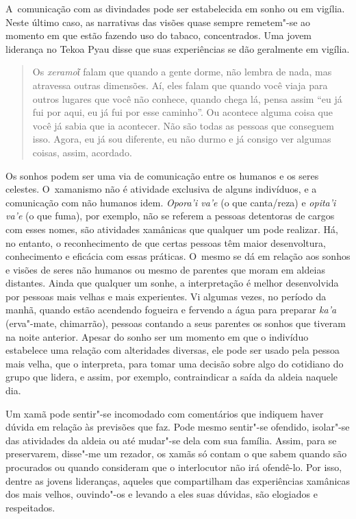 A~comunicação com as divindades pode ser estabelecida em sonho ou em
vigília. Neste último caso, as narrativas das visões quase sempre
remetem"-se ao momento em que estão fazendo uso do tabaco, concentrados.
Uma jovem liderança no Tekoa Pyau disse que suas experiências se dão
geralmente em vigília.

\begin{quote}
Os \emph{xeramoῖ} falam que quando a gente dorme, não lembra de nada,
mas atravessa outras dimensões. Aí, eles falam que quando você viaja
para outros lugares que você não conhece, quando chega lá, pensa assim
``eu já fui por aqui, eu já fui por esse caminho''. Ou acontece alguma
coisa que você já sabia que ia acontecer. Não são todas as pessoas que
conseguem isso. Agora, eu já sou diferente, eu não durmo e já consigo
ver algumas coisas, assim, acordado.
\end{quote}

Os sonhos podem ser uma via de comunicação entre os humanos e os seres
celestes. O~xamanismo não é atividade exclusiva de alguns indivíduos, e
a comunicação com não humanos idem. \emph{Opora’i va’e} (o que canta/reza) e
\emph{opita’i va’e} (o que fuma), por exemplo, não se referem a pessoas
detentoras de cargos com esses nomes, são atividades xamânicas que
qualquer um pode realizar. Há, no entanto, o reconhecimento de que
certas pessoas têm maior desenvoltura, conhecimento e eficácia com
essas práticas. O~mesmo se dá em relação aos sonhos e visões de seres
não humanos ou mesmo de parentes que moram em aldeias distantes. Ainda
que qualquer um sonhe, a interpretação é melhor desenvolvida por
pessoas mais velhas e mais experientes. Vi algumas vezes, no período da
manhã, quando estão acendendo fogueira e fervendo a água para preparar
\emph{ka’a} (erva"-mate, chimarrão), pessoas contando a seus parentes os sonhos
que tiveram na noite anterior. Apesar do sonho ser um momento em que o
indivíduo estabelece uma relação com alteridades diversas, ele pode ser
usado pela pessoa mais velha, que o interpreta, para tomar uma decisão
sobre algo do cotidiano do grupo que lidera, e assim, por exemplo,
contraindicar a saída da aldeia naquele dia.

Um xamã pode sentir"-se incomodado com comentários que indiquem haver
dúvida em relação às previsões que faz. Pode mesmo sentir"-se ofendido,
isolar"-se das atividades da aldeia ou até mudar"-se dela com sua
família. Assim, para se preservarem, disse"-me um rezador, os xamãs só
contam o que sabem quando são procurados ou quando consideram que o
interlocutor não irá ofendê-lo. Por isso, dentre as jovens lideranças,
aqueles que compartilham das experiências xamânicas dos mais velhos,
ouvindo"-os e levando a eles suas dúvidas, são elogiados e respeitados.

